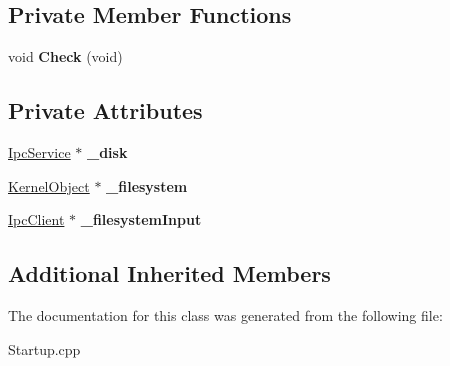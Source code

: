 \subsection*{Private Member Functions}
\begin{DoxyCompactItemize}
\item 
\mbox{\label{class_startup___internal_1_1_waiting_for_disk_aca1ba618442f5d0de731b3368b522ef7}} 
void {\bfseries Check} (void)
\end{DoxyCompactItemize}
\subsection*{Private Attributes}
\begin{DoxyCompactItemize}
\item 
\mbox{\label{class_startup___internal_1_1_waiting_for_disk_a973308e302fc7f5aeda9a21e3e2c3182}} 
\hyperlink{class_ipc_service}{Ipc\+Service} $\ast$ {\bfseries \+\_\+disk}
\item 
\mbox{\label{class_startup___internal_1_1_waiting_for_disk_a3a577505af1ca7ad0783a55a417d5eb9}} 
\hyperlink{class_kernel_object}{Kernel\+Object} $\ast$ {\bfseries \+\_\+filesystem}
\item 
\mbox{\label{class_startup___internal_1_1_waiting_for_disk_ae9002387bbfdaf72bcb09f4476627273}} 
\hyperlink{class_ipc_client}{Ipc\+Client} $\ast$ {\bfseries \+\_\+filesystem\+Input}
\end{DoxyCompactItemize}
\subsection*{Additional Inherited Members}


The documentation for this class was generated from the following file\+:\begin{DoxyCompactItemize}
\item 
Startup.\+cpp\end{DoxyCompactItemize}
